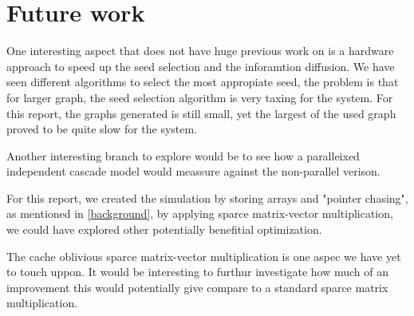 \chapter{Future work}
One interesting aspect that does not have huge previous work on is a hardware approach to speed up the seed selection and the inforamtion diffusion. We have seen different algorithms to select the most appropiate seed, the problem is that for larger graph, the seed selection algorithm is very taxing for the system. For this report, the graphs generated is still small, yet the largest of the used graph proved to be quite slow for the system. 

Another interesting branch to explore would be to see how a paralleixed independent cascade model would meassure against the non-parallel verison. 

For this report, we created the simulation by storing arrays and "pointer chasing", as mentioned in \ref{background}, by applying sparce matrix-vector multiplication, we could have explored other potentially benefitial optimization. 

The cache oblivious sparce matrix-vector multiplication is one aspec we have yet to touch uppon. It would be interesting to furthur investigate how much of an improvement this would potentially give compare to a standard sparce matrix multiplication.